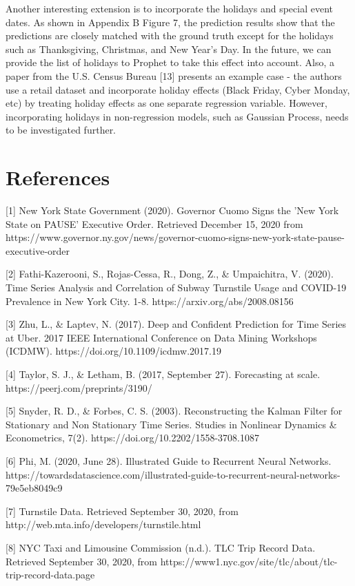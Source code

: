 \documentclass{article}
\begin{document}
Another interesting extension is to incorporate the holidays and special event dates. As shown in Appendix B Figure 7, the prediction results show that the predictions are closely matched with the ground truth except for the holidays such as Thanksgiving, Christmas, and New Year’s Day. In the future, we can provide the list of holidays to Prophet to take this effect into account. Also, a paper from the U.S. Census Bureau [13] presents an example case - the authors use a retail dataset and incorporate holiday effects (Black Friday, Cyber Monday, etc) by treating holiday effects as one separate regression variable. However, incorporating holidays in non-regression models, such as Gaussian Process, needs to be investigated further.   

\newpage
\section*{References}

\small

[1] New York State Government (2020). Governor Cuomo Signs the 'New York State on PAUSE' Executive Order. Retrieved December 15, 2020 from https://www.governor.ny.gov/news/governor-cuomo-signs-new-york-state-pause-executive-order

[2] Fathi-Kazerooni, S., Rojas-Cessa,  R., Dong, Z., & Umpaichitra, V. (2020). Time Series Analysis and Correlation of Subway Turnstile Usage and COVID-19 Prevalence in New York City. 1-8. https://arxiv.org/abs/2008.08156

[3] Zhu, L., & Laptev, N. (2017). Deep and Confident Prediction for Time Series at Uber. 2017 IEEE International Conference on Data Mining Workshops (ICDMW). https://doi.org/10.1109/icdmw.2017.19 

[4] Taylor, S. J., & Letham, B. (2017, September 27). Forecasting at scale. https://peerj.com/preprints/3190/ 

[5] Snyder, R. D., & Forbes, C. S. (2003). Reconstructing the Kalman Filter for Stationary and Non Stationary Time Series. Studies in Nonlinear Dynamics & Econometrics, 7(2). https://doi.org/10.2202/1558-3708.1087 

[6] Phi, M. (2020, June 28). Illustrated Guide to Recurrent Neural Networks. https://towardsdatascience.com/illustrated-guide-to-recurrent-neural-networks-79e5eb8049c9

[7] Turnstile Data. Retrieved September 30, 2020, from
http://web.mta.info/developers/turnstile.html

[8] NYC Taxi and Limousine Commission (n.d.). TLC Trip Record Data. Retrieved September 30, 2020, from https://www1.nyc.gov/site/tlc/about/tlc-trip-record-data.page
\end{document}
